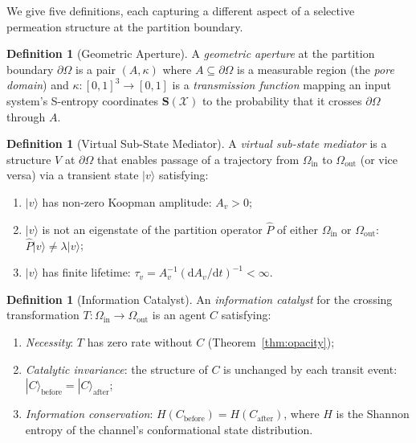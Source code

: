 \documentclass[11pt,twocolumn,a4paper]{article}
\theoremstyle{definition}
\newtheorem{definition}[theorem]{Definition}
\theoremstyle{remark}
\newcommand{\kap}{\kappa}
\newcommand{\Sent}{\bm{S}}
\begin{document}
We give five definitions, each capturing a different aspect of a selective
permeation structure at the partition boundary.

\begin{definition}[Geometric Aperture]
\label{def:geom}
A \emph{geometric aperture} at the partition boundary $\partial\Omega$ is a
pair $(A, \kap)$ where $A \subseteq \partial\Omega$ is a measurable region
(the \emph{pore domain}) and $\kap: [0,1]^3 \to [0,1]$ is a
\emph{transmission function} mapping an input system's S-entropy coordinates
$\Sent(\mathcal{X})$ to the probability that it crosses $\partial\Omega$
through $A$.
\end{definition}

\begin{definition}[Virtual Sub-State Mediator]
\label{def:virtual}
A \emph{virtual sub-state mediator} is a structure $V$ at $\partial\Omega$
that enables passage of a trajectory from $\Omega_{\mathrm{in}}$ to
$\Omega_{\mathrm{out}}$ (or vice versa) via a transient state $|v\rangle$
satisfying:
\begin{enumerate}[nosep, label=(\roman*)]
\item $|v\rangle$ has non-zero Koopman amplitude: $A_v > 0$;
\item $|v\rangle$ is not an eigenstate of the partition operator $\hat{P}$
  of either $\Omega_{\mathrm{in}}$ or $\Omega_{\mathrm{out}}$:
  $\hat{P}|v\rangle \neq \lambda|v\rangle$;
\item $|v\rangle$ has finite lifetime: $\tau_v = A_v^{-1}(\mathrm{d}A_v/\mathrm{d}t)^{-1}
  < \infty$.
\end{enumerate}
\end{definition}

\begin{definition}[Information Catalyst]
\label{def:catalyst}
An \emph{information catalyst} for the crossing transformation
$T: \Omega_{\mathrm{in}} \to \Omega_{\mathrm{out}}$ is an agent $C$ satisfying:
\begin{enumerate}[nosep, label=(\roman*)]
\item \textit{Necessity}: $T$ has zero rate without $C$
  (Theorem~\ref{thm:opacity});
\item \textit{Catalytic invariance}: the structure of $C$ is unchanged by each
  transit event: $|C\rangle_{\mathrm{before}} = |C\rangle_{\mathrm{after}}$;
\item \textit{Information conservation}: $H(C_{\mathrm{before}}) = H(C_{\mathrm{after}})$,
  where $H$ is the Shannon entropy of the channel's conformational state
  distribution.
\end{enumerate}
\end{definition}
\end{document}

